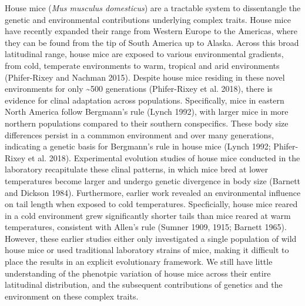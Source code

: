 \documentclass[]{article}
\begin{document}
House mice (\emph{Mus musculus domesticus}) are a tractable system to
dissentangle the genetic and environmental contributions underlying
complex traits. House mice have recently expanded their range from
Western Europe to the Americas, where they can be found from the tip of
South America up to Alaska. Across this broad latitudinal range, house
mice are exposed to various environmental gradients, from cold,
temperate environments to warm, tropical and arid environments
(Phifer-Rixey and Nachman 2015). Despite house mice residing in these
novel environments for only \textasciitilde{}500 generations
(Phifer-Rixey et al. 2018), there is evidence for clinal adaptation
across populations. Specifically, mice in eastern North America follow
Bergmann's rule (Lynch 1992), with larger mice in more northern
populations compared to their southern conspecifics. These body size
differences persist in a commmon environment and over many generations,
indicating a genetic basis for Bergmann's rule in house mice (Lynch
1992; Phifer-Rixey et al. 2018). Experimental evolution studies of house
mice conducted in the laboratory recapitulate these clinal patterns, in
which mice bred at lower temperatures become larger and undergo genetic
divergence in body size (Barnett and Dickson 1984). Furthermore, earlier
work revealed an environmental influence on tail length when exposed to
cold temperatures. Specficially, house mice reared in a cold environment
grew significantly shorter tails than mice reared at warm temperatures,
consistent with Allen's rule (Sumner 1909, 1915; Barnett 1965). However,
these earlier studies either only investigated a single population of
wild house mice or used traditional laboratory strains of mice, making
it difficult to place the results in an explicit evolutionary framework.
We still have little understanding of the phenotpic variation of house
mice across their entire latitudinal distribution, and the subsequent
contributions of genetics and the environment on these complex traits.
\end{document}
